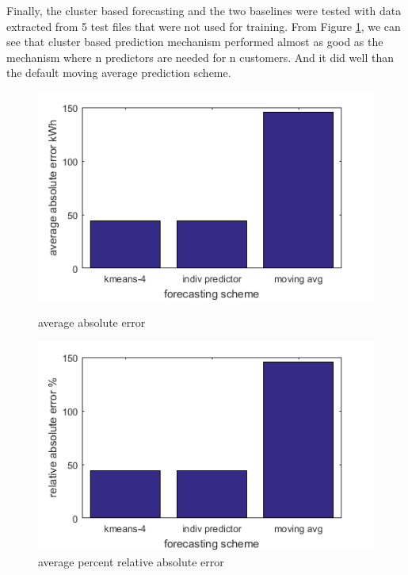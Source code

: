 Finally, the cluster based forecasting and the two baselines were tested with data extracted from 5 test files that were not used for training. From Figure \ref{fig:prediction-scheme-vs-error}, we can see that cluster based prediction mechanism performed almost as good as the mechanism where n predictors are needed for n customers. And it did well than the default moving average prediction scheme.



\begin{figure}[h!]
\centering
\begin{minipage}{.5\textwidth}
  \centering
  \includegraphics[width=\linewidth]{final-avg-abs-error.png}
  \caption{average absolute error}
  \label{fig:prediction-scheme-vs-error}
\end{minipage}%
\begin{minipage}{.5\textwidth}
  \centering
  \includegraphics[width=\linewidth]{final-relative-abs-error.png}
  \caption{average percent relative absolute error}
\end{minipage}

  
\end{figure}
